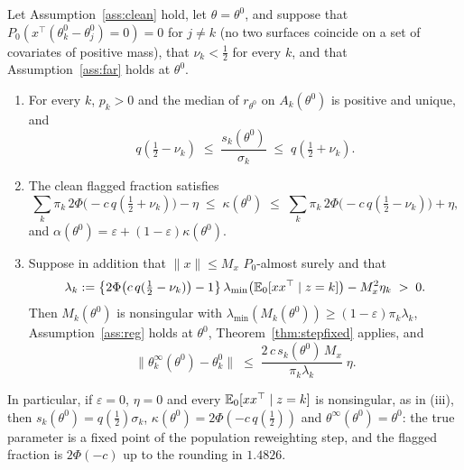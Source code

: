\begin{theorem}
\label{thm:steptrue}
Let Assumption~\ref{ass:clean} hold, let $\theta=\theta^{0}$, and suppose that
$P_0(x^{\top}(\theta^{0}_k-\theta^{0}_j)=0)=0$ for $j\ne k$ (no two surfaces coincide on a
set of covariates of positive mass), that $\nu_k<\tfrac12$ for every $k$, and that
Assumption~\ref{ass:far} holds at $\theta^{0}$.
\begin{enumerate}[label=(\roman*),leftmargin=2.2em,itemsep=2pt]
\item For every $k$, $p_k>0$ and the median of $r_{\theta^{0}}$ on $A_k(\theta^{0})$ is
positive and unique, and
\[
q(\tfrac12-\nu_k)\;\le\;\frac{s_k(\theta^{0})}{\sigma_k}\;\le\;q(\tfrac12+\nu_k).
\]
\item The clean flagged fraction satisfies
\[
\sum_k\pi_k\,2\Phi\bigl(-c\,q(\tfrac12+\nu_k)\bigr)-\eta
\;\le\;\kappa(\theta^{0})\;\le\;
\sum_k\pi_k\,2\Phi\bigl(-c\,q(\tfrac12-\nu_k)\bigr)+\eta,
\]
and $\alpha(\theta^{0})=\varepsilon+(1-\varepsilon)\kappa(\theta^{0})$.
\item Suppose in addition that $\|x\|\le M_x$ $P_0$-almost surely and that
\[
\lambda_k:=\bigl\{2\Phi\bigl(c\,q(\tfrac12-\nu_k)\bigr)-1\bigr\}\,
\lambda_{\min}\bigl(\mathbb{E}_0[xx^{\top}\mid z=k]\bigr)-M_x^{2}\eta_k\;>\;0 .
\]
Then $M_k(\theta^{0})$ is nonsingular with $\lambda_{\min}(M_k(\theta^{0}))\ge(1-\varepsilon)\pi_k\lambda_k$,
Assumption~\ref{ass:reg} holds at $\theta^{0}$, Theorem~\ref{thm:stepfixed} applies, and
\[
\bigl\|\theta^{\infty}_k(\theta^{0})-\theta^{0}_k\bigr\|\;\le\;
\frac{2\,c\,s_k(\theta^{0})\,M_x}{\pi_k\lambda_k}\;\eta .
\]
\end{enumerate}
In particular, if $\varepsilon=0$, $\eta=0$ and every $\mathbb{E}_0[xx^{\top}\mid z=k]$ is nonsingular, as in (iii), then $s_k(\theta^{0})=q(\tfrac12)\sigma_k$,
$\kappa(\theta^{0})=2\Phi(-c\,q(\tfrac12))$ and $\theta^{\infty}(\theta^{0})=\theta^{0}$:
the true parameter is a fixed point of the population reweighting step, and the flagged
fraction is $2\Phi(-c)$ up to the rounding in $1.4826$.
\end{theorem}

